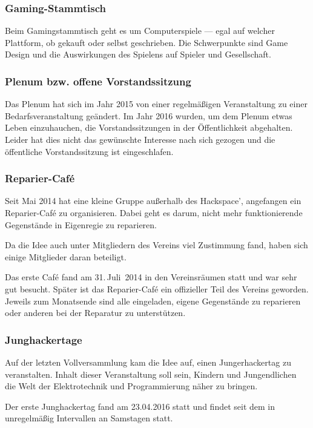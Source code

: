 \documentclass[ngerman]{scrartcl}
\begin{document}
\subsubsection{Gaming-Stammtisch}

Beim Gamingstammtisch geht es um Computerspiele — egal auf welcher
Plattform, ob gekauft oder selbst geschrieben. Die Schwerpunkte sind
Game Design und die Auswirkungen des Spielens auf Spieler und
Gesellschaft.

\subsubsection{Plenum bzw. offene Vorstandssitzung}

Das Plenum hat sich im Jahr 2015 von einer regelmäßigen Veranstaltung
zu einer Bedarfsveranstaltung geändert. Im Jahr 2016 wurden, um dem
Plenum etwas Leben einzuhauchen, die Vorstandssitzungen in der
Öffentlichkeit abgehalten. Leider hat dies nicht das gewünschte
Interesse nach sich gezogen und die öffentliche Vorstandssitzung ist
eingeschlafen.

\subsubsection{Reparier-Café}

Seit Mai 2014 hat eine kleine Gruppe außerhalb des Hackspace',
angefangen ein Reparier-Café zu organisieren. Dabei geht es darum,
nicht mehr funktionierende Gegenstände in Eigenregie zu reparieren.

Da die Idee auch unter Mitgliedern des Vereins viel Zustimmung fand,
haben sich einige Mitglieder daran beteiligt.

Das erste Café fand am 31.\,Juli~2014 in den Vereinsräumen statt und
war sehr gut besucht.  Später ist das Reparier-Café ein offizieller
Teil des Vereins geworden. Jeweils zum Monatsende sind alle
eingeladen, eigene Gegenstände zu reparieren oder anderen bei der
Reparatur zu unterstützen.

\subsubsection{Junghackertage}

Auf der letzten Vollversammlung kam die Idee auf, einen
Jungerhackertag zu veranstalten. Inhalt dieser Veranstaltung soll
sein, Kindern und Jungendlichen die Welt der Elektrotechnik und
Programmierung näher zu bringen.

Der erste Junghackertag fand am 23.04.2016 statt und findet seit dem in
unregelmäßig Intervallen an Samstagen statt.
\end{document}
